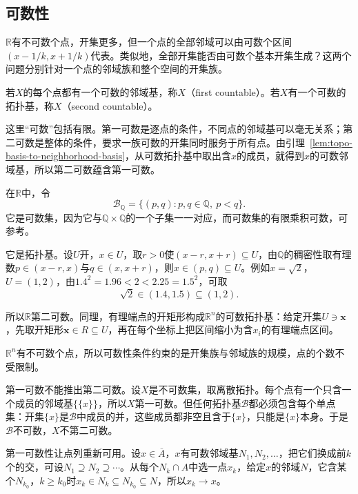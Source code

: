 \subsection{可数性}
\label{sec:topo-countability}

$\mathbb R$有不可数个点，开集更多，但一个点的全部邻域可以由可数个区间$(x-1/k,x+1/k)$代表。类似地，全部开集能否由可数个基本开集生成？这两个问题分别针对一个点的邻域族和整个空间的开集族。

\begin{definition}[第一可数与第二可数]
\label{def:topo-countability}
若$X$的每个点都有一个可数的邻域基，称$X$（first countable）。若$X$有一个可数的拓扑基，称$X$（second countable）。
\end{definition}

这里“可数”包括有限。第一可数是逐点的条件，不同点的邻域基可以毫无关系；第二可数是整体的条件，要求一族可数的开集同时服务于所有点。由引理~\ref{lem:topo-basis-to-neighborhood-basis}，从可数拓扑基中取出含$x$的成员，就得到$x$的可数邻域基，所以第二可数蕴含第一可数。

\begin{example}[有理端点区间]
\label{ex:topo-rational-intervals}
在$\mathbb R$中，令
\[
 \mathcal B_{\mathbb Q}=\{(p,q):p,q\in\mathbb Q,\ p<q\}.
\]
它是可数集，因为它与$\mathbb Q\times\mathbb Q$的一个子集一一对应，而可数集的有限乘积可数，可参考。

它是拓扑基。设$U$开，$x\in U$，取$r>0$使$(x-r,x+r)\subseteq U$，由$\mathbb Q$的稠密性取有理数$p\in(x-r,x)$与$q\in(x,x+r)$，则$x\in(p,q)\subseteq U$。例如$x=\sqrt2$，$U=(1,2)$，由$1.4^2=1.96<2<2.25=1.5^2$，可取
\[
 \sqrt2\in(1.4,1.5)\subseteq(1,2).
\]

所以$\mathbb R$第二可数。同理，有理端点的开矩形构成$\mathbb R^n$的可数拓扑基：给定开集$U\ni\bm x$，先取开矩形$\bm x\in R\subseteq U$，再在每个坐标上把区间缩小为含$x_i$的有理端点区间。
\end{example}

$\mathbb R^n$有不可数个点，所以可数性条件约束的是开集族与邻域族的规模，点的个数不受限制。

第一可数不能推出第二可数。设$X$是不可数集，取离散拓扑。每个点有一个只含一个成员的邻域基$\{\{x\}\}$，所以$X$第一可数。但任何拓扑基$\mathcal B$都必须包含每个单点集：开集$\{x\}$是$\mathcal B$中成员的并，这些成员都非空且含于$\{x\}$，只能是$\{x\}$本身。于是$\mathcal B$不可数，$X$不第二可数。

第一可数性让点列重新可用。设$x\in\overline A$，$x$有可数邻域基$N_1,N_2,\dots$，把它们换成前$k$个的交，可设$N_1\supseteq N_2\supseteq\cdots$。从每个$N_k\cap A$中选一点$x_k$，给定$x$的邻域$N$，它含某个$N_{k_0}$，$k\geq k_0$时$x_k\in N_k\subseteq N_{k_0}\subseteq N$，所以$x_k\to x$。

